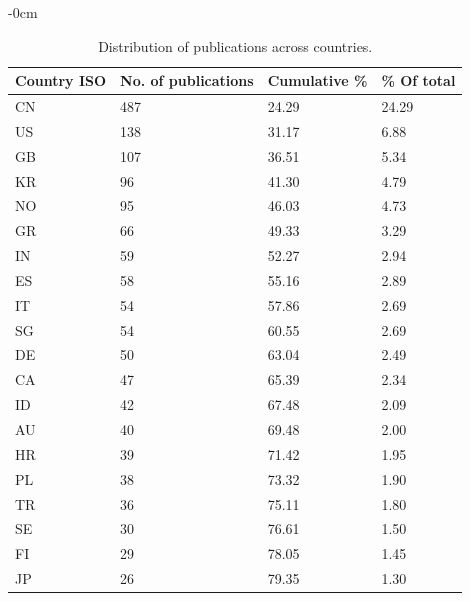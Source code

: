 \documentclass[jmse,review,submit,pdftex,moreauthors]{Definitions/mdpi}
\begin{document}
\begin{adjustwidth}{-\extralength}{0cm}
\begin{table}[H]
	\centering
	\caption{Distribution of publications across countries.}
	\begin{tabularx}{\linewidth}{XXXX}
		\hline
		Country ISO & No. of publications & Cumulative \% & \% Of total \\
		\hline
		CN & 487 & 24.29 & 24.29\\
		US & 138 & 31.17 & 6.88\\
		GB & 107 & 36.51 & 5.34\\
		KR & 96 & 41.30 & 4.79\\
		NO & 95 & 46.03 & 4.73\\
		GR & 66 & 49.33 & 3.29\\
		IN & 59 & 52.27 & 2.94\\
		ES & 58 & 55.16 & 2.89\\
		IT & 54 & 57.86 & 2.69\\
		SG & 54 & 60.55 & 2.69\\
		DE & 50 & 63.04 & 2.49\\
		CA & 47 & 65.39 & 2.34\\
		ID & 42 & 67.48 & 2.09\\
		AU & 40 & 69.48 & 2.00\\
		HR & 39 & 71.42 & 1.95\\
		PL & 38 & 73.32 & 1.90\\
		TR & 36 & 75.11 & 1.80\\
		SE & 30 & 76.61 & 1.50\\
		FI & 29 & 78.05 & 1.45\\
		JP & 26 & 79.35 & 1.30\\
		\hline
	\end{tabularx}
	\label{tab:resdesccountry}
\end{table}


\end{adjustwidth}
\end{document}
